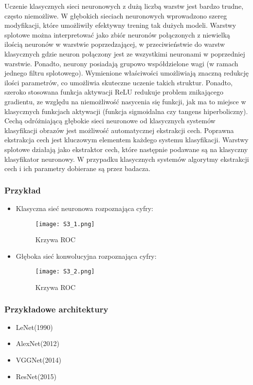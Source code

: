 Uczenie klasycznych sieci neuronowych z dużą liczbą warstw jest bardzo trudne, często niemożliwe. W głębokich sieciach neuronowych wprowadzono szereg modyfikacji, które umożliwiły efektywny trening tak dużych modeli. Warstwy splotowe można interpretować jako zbiór neuronów połączonych z niewielką ilością neuronów w warstwie poprzedzającej, w przeciwieństwie do warstw klasycznych gdzie neuron połączony jest ze wszystkimi neuronami w poprzedniej warstwie. Ponadto, neurony posiadają grupowo współdzielone wagi (w ramach jednego filtru splotowego). Wymienione właściwości umożliwiają znaczną redukcję ilości parametrów, co umożliwia skuteczne uczenie takich struktur. Ponadto, szeroko stosowana funkcja aktywacji ReLU redukuje problem znikającego gradientu, ze względu na niemożliwość nasycenia się funkcji, jak ma to miejsce w klasycznych funkcjach aktywacji (funkcja sigmoidalna czy tangens hiperboliczny). \\

Cechą odróżniającą głębokie sieci neuronowe od klasycznych systemów klasyfikacji obrazów jest możliwość automatycznej ekstrakcji cech. Poprawna ekstrakcja cech jest kluczowym elementem każdego systemu klasyfikacji. Warstwy splotowe działają jako ekstraktor cech, które następnie podawane są na klasyczny klasyfikator neuronowy. W przypadku klasycznych systemów algorytmy ekstrakcji cech i ich parametry dobierane są przez badacza.

\subsubsection{Przykład}

\begin{itemize}
	\item Klasyczna sieć neuronowa rozpoznająca cyfry:
		\begin{figure}[H]
			\centering
			\texttt{[image: S3\_1.png]}
			\caption{Krzywa ROC}
		\end{figure}
	\item Głęboka sieć konwolucyjna rozpoznająca cyfry:
		\begin{figure}[H]
			\centering
			\texttt{[image: S3\_2.png]}
			\caption{Krzywa ROC}
		\end{figure}
\end{itemize}

\subsubsection{Przykładowe architektury}

\begin{itemize}
	\item LeNet(1990)
	\item AlexNet(2012)
	\item VGGNet(2014)
	\item ResNet(2015)
\end{itemize}
